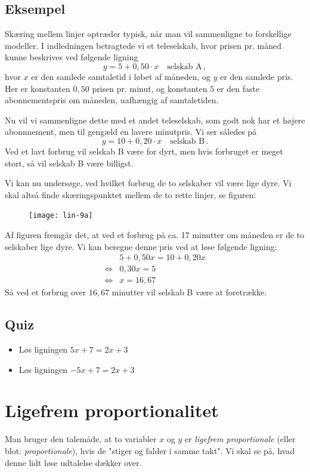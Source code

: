 \documentclass[12pt,oneside,a4paper]{article}
\begin{document}
\subsection{Eksempel}
Skæring mellem linjer optræder typisk, når man vil sammenligne to forskellige
modeller.  I indledningen betragtede vi et teleselskab, hvor prisen pr. måned
kunne beskrives ved følgende ligning
\[
    y = 5 + 0,50 \cdot x \quad \mbox{selskab A}\,,
\]
hvor $x$ er den samlede samtaletid i løbet af måneden, og $y$ er den samlede
pris. Her er konstanten $0,50$ prisen pr. minut, og konstanten $5$ er den faste
abonnementspris om måneden, uafhængig af samtaletiden.

Nu vil vi sammenligne dette med et andet teleselskab, som godt nok har et højere abonnnement,
men til gengæld en lavere minutpris. Vi ser således på
\[
    y = 10 + 0,20 \cdot x \quad \mbox{selskab B}\,.
\]
Ved et lavt forbrug vil selskab B være for dyrt, men hvis forbruget er meget stort, så vil
selskab B være billigst.

Vi kan nu undersøge, ved hvilket forbrug de to selskaber vil være lige dyre. Vi skal 
altså finde skæringspunktet mellem de to rette linjer, se figuren:
\begin{figure}[H]
    \centering
    \texttt{[image: lin-9a]}
\end{figure}
Af figuren fremgår det, at ved et forbrug på ca. 17 minutter om måneden er de to selskaber
lige dyre. Vi kan beregne denne pris ved at løse følgende ligning:
\[
\begin{aligned}
    & 5 + 0,50 x = 10 + 0,20 x \\
    \iff & 0,30x = 5 \\
    \iff & x = 16,67
\end{aligned}
\]
Så ved et forbrug over $16,67$ minutter vil selskab B være at foretrække.

\subsection{Quiz}
\begin{itemize}
    \item Løs ligningen $5x+7 = 2x+3$
    \item Løs ligningen $-5x+7 = 2x+3$
\end{itemize}



\section{Ligefrem proportionalitet}
Man bruger den talemåde, at to variabler $x$ og $y$ er {\em ligefrem
proportionale} (eller blot: {\em proportionale}), hvis de "stiger og falder i
samme takt". Vi skal se på, hvad denne lidt løse udtalelse dækker over.
\end{document}
